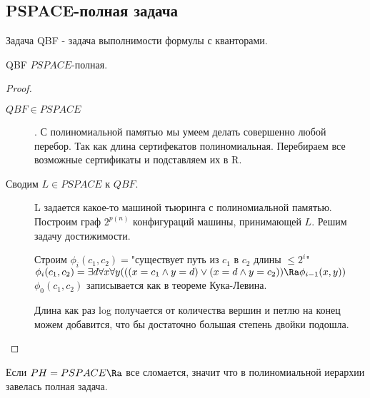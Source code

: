 \subsection{PSPACE-полная задача}
\begin{Def}
	Задача QBF - задача выполнимости формулы с кванторами. 
\end{Def}
\begin{theorem}
	QBF $PSPACE$-полная. 
\end{theorem}
\begin{proof}
	\begin{description}
	\item[$QBF \in  PSPACE$]. 
	С полиномиальной памятью мы умеем делать совершенно любой перебор. 
	Так как длина сертифекатов полиномиальная. 
	Перебираем все возможные сертификаты и подставляем их в R.

	\item[Сводим $L \in PSPACE$ к $QBF$.]
	L задается какое-то машиной тьюринга с полиномиальной памятью.\\ 
	
	Построим граф $2^{p(n)}$ конфигураций машины, принимающей $L$. Решим задачу достижимости.

	Строим $\phi_i(c_1, c_2) = $"существует путь из $c_1$ в $c_2$ длины $\le 2^i$"\\
	
	$\phi_i(c_1, c_2) = \exists d \forall x \forall y(((x = c_1 \wedge y = d) \vee (x = d \wedge y = c_2)) \Ra \phi_{i - 1}(x, y))$\\
	$\phi_0(c_1, c_2)$ записывается как в теореме Кука-Левина.  
	
	Длина как раз log получается от количества вершин и петлю на конец можем добавится, что бы достаточно большая степень двойки подошла.
	\end{description}
\end{proof}

\begin{conseq}
	Если $PH = PSPACE \Ra$ все сломается, значит что в полиномиальной иерархии завелась полная задача. 
\end{conseq}